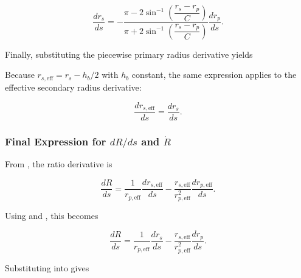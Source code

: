 \documentclass[11pt]{article}
\numberwithin{equation}{section}
\begin{document}
\begin{equation}
\frac{dr_s}{ds}
=
-
\frac{
\pi - 2\sin^{-1}\!\left(\dfrac{r_s-r_p}{C}\right)
}{
\pi + 2\sin^{-1}\!\left(\dfrac{r_s-r_p}{C}\right)
}
\frac{dr_p}{ds}.
\label{eq:drsds_subbed}
\end{equation}

Finally, substituting the piecewise primary radius derivative
 yields


Because $r_{s,\mathrm{eff}} = r_s - h_b/2$ with $h_b$ constant, the same
expression applies to the effective secondary radius derivative:

\begin{equation}
\frac{dr_{s,\mathrm{eff}}}{ds} = \frac{dr_s}{ds}.
\label{eq:drseffds_final}
\end{equation}

\subsubsection{Final Expression for \texorpdfstring{$dR/ds$}{dR/ds} and \texorpdfstring{$\dot R$}{Rdot}}
\label{sec:dRds_final}

From , the ratio derivative is

\begin{equation}
\frac{dR}{ds}
=
\frac{1}{r_{p,\mathrm{eff}}}\frac{dr_{s,\mathrm{eff}}}{ds}
-
\frac{r_{s,\mathrm{eff}}}{r_{p,\mathrm{eff}}^2}\frac{dr_{p,\mathrm{eff}}}{ds}.
\label{eq:dRds_recalled}
\end{equation}

Using  and , this becomes

\begin{equation}
\frac{dR}{ds}
=
\frac{1}{r_{p,\mathrm{eff}}}\frac{dr_s}{ds}
-
\frac{r_{s,\mathrm{eff}}}{r_{p,\mathrm{eff}}^2}\frac{dr_p}{ds}.
\label{eq:dRds_sub_radii}
\end{equation}

Substituting  into  gives
\end{document}
